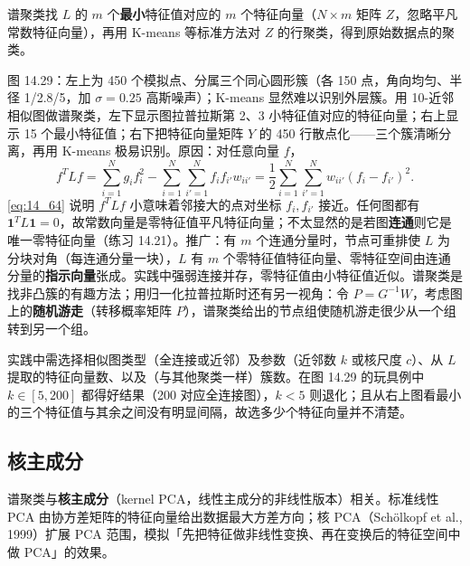 谱聚类找 $L$ 的 $m$ 个\textbf{最小}特征值对应的 $m$ 个特征向量（$N\times m$ 矩阵 $Z$，忽略平凡常数特征向量），再用 K-means 等标准方法对 $Z$ 的行聚类，得到原始数据点的聚类。

\begin{example}[谱聚类为什么有效]
图 14.29：左上为 450 个模拟点、分属三个同心圆形簇（各 150 点，角向均匀、半径 1/2.8/5，加 $\sigma=0.25$ 高斯噪声）；K-means 显然难以识别外层簇。用 10-近邻相似图做谱聚类，左下显示图拉普拉斯第 2、3 小特征值对应的特征向量；右上显示 15 个最小特征值；右下把特征向量矩阵 $Y$ 的 450 行散点化——三个簇清晰分离，再用 K-means 极易识别。原因：对任意向量 $f$，
\begin{equation}
f^T Lf = \sum_{i=1}^{N}g_i f_i^2 - \sum_{i=1}^{N}\sum_{i'=1}^{N}f_i f_{i'} w_{ii'}
= \frac12\sum_{i=1}^{N}\sum_{i'=1}^{N}w_{ii'}(f_i-f_{i'})^2. \label{eq:14_64}
\end{equation}
\eqref{eq:14_64} 说明 $f^T Lf$ 小意味着邻接大的点对坐标 $f_i,f_{i'}$ 接近。任何图都有 $\mathbf{1}^T L\mathbf{1}=0$，故常数向量是零特征值平凡特征向量；不太显然的是若图\textbf{连通}则它是唯一零特征向量（练习 14.21）。推广：有 $m$ 个连通分量时，节点可重排使 $L$ 为分块对角（每连通分量一块），$L$ 有 $m$ 个零特征值特征向量、零特征空间由连通分量的\textbf{指示向量}张成。实践中强弱连接并存，零特征值由小特征值近似。谱聚类是找非凸簇的有趣方法；用归一化拉普拉斯时还有另一视角：令 $P=G^{-1}W$，考虑图上的\textbf{随机游走}（转移概率矩阵 $P$），谱聚类给出的节点组使随机游走很少从一个组转到另一个组。
\end{example}

\begin{remark}[谱聚类的实际问题]
实践中需选择相似图类型（全连接或近邻）及参数（近邻数 $k$ 或核尺度 $c$）、从 $L$ 提取的特征向量数、以及（与其他聚类一样）簇数。在图 14.29 的玩具例中 $k\in[5,200]$ 都得好结果（200 对应全连接图），$k<5$ 则退化；且从右上图看最小的三个特征值与其余之间没有明显间隔，故选多少个特征向量并不清楚。
\end{remark}

\subsection{核主成分}

谱聚类与\textbf{核主成分}（kernel PCA，线性主成分的非线性版本）相关。标准线性 PCA 由协方差矩阵的特征向量给出数据最大方差方向；核 PCA（Schölkopf et al., 1999）扩展 PCA 范围，模拟「先把特征做非线性变换、再在变换后的特征空间中做 PCA」的效果。

